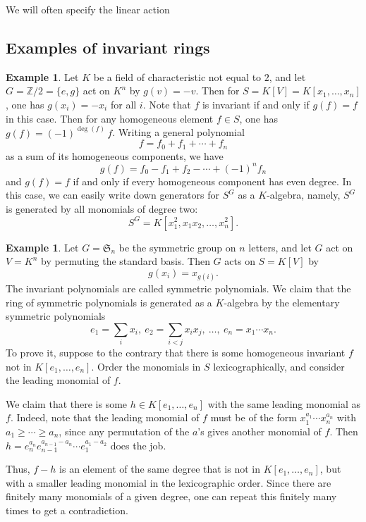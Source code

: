 \documentclass[12pt]{amsart}
\theoremstyle{definition}
\newtheorem{example}[theorem]{Example}
\numberwithin{equation}{theorem}
\def\ZZ{\mathbb{Z}}
\begin{document}
We will often specify the linear action

\subsection*{Examples of invariant rings}

\begin{example}\label{ex1}
Let $K$ be a field of characteristic not equal to $2$, and let $G=\ZZ/2 = \{e,g\}$ act on $K^n$ by $g(v)=-v$. Then for $S=K[V] = K[x_1,\dots,x_n]$, one has $g(x_i)=-x_i$ for all $i$. Note that $f$ is invariant if and only if $g(f)=f$ in this case. Then for any homogeneous element $f\in S$, one has $g(f)= (-1)^{\deg(f)} \, f$. Writing a general polynomial
\[ f= f_0 + f_1 + \cdots + f_n\]
as a sum of its homogeneous components, we have 
\[ g(f) = f_0 - f_1 + f_2 - \cdots + (-1)^n f_n\]
and $g(f)=f$ if and only if every homogeneous component has even degree. In this case, we can easily write down generators for $S^G$ as a $K$-algebra, namely, $S^G$ is generated by all monomials of degree two:
\[ S^G = K[x_1^2, x_1 x_2, \dots, x_n^2].\]
\end{example}

\begin{example}
Let $G=\mathfrak{S}_n$ be the symmetric group on $n$ letters, and let $G$ act on $V=K^n$ by permuting the standard basis. Then $G$ acts on $S=K[V]$ by
\[ g(x_i) = x_{g(i)}.\]
The invariant polynomials are called symmetric polynomials. We claim that the ring of symmetric polynomials is generated as a $K$-algebra by the elementary symmetric polynomials
\[ e_1 =  \sum_i x_i , \ e_2 = \sum_{i<j} x_i x_j , \ \dots, \ e_n = x_1 \cdots x_n.\]
To prove it, suppose to the contrary that there is some homogeneous invariant $f$ not in $K[e_1,\dots,e_n]$. Order the monomials in $S$ lexicographically, and consider the leading monomial of $f$. 

We claim that there is some $h\in K[e_1,\dots,e_n]$ with the same leading monomial as $f$. Indeed, note that the leading monomial of $f$ must be of the form $x_1^{a_1} \cdots x_n^{a_n}$ with $a_1\geq \cdots \geq a_n$, since any permutation of the $a$'s gives another monomial of $f$. Then  $h=e_n^{a_n} e_{n-1}^{a_{n-1}-a_n} \cdots e_1^{a_1-a_2}$ does the job.

Thus, $f-h$ is an element of the same degree that is not in $K[e_1,\dots,e_n]$, but with a smaller leading monomial in the lexicographic order. Since there are finitely many monomials of a given degree, one can repeat this finitely many times to get a contradiction.
\end{example}
\end{document}
